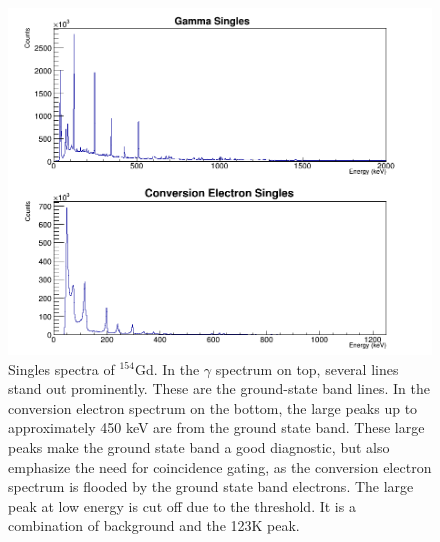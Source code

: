 \begin{figure}[!]
    \centering
    \includegraphics[scale=0.4]{154GdTablesAndFigs/154Gd_Singles.png}
    \caption{Singles spectra of $^{154}$Gd. In the $\gamma$ spectrum on top, several lines stand out prominently. These are the ground-state band lines. In the conversion electron spectrum on the bottom, the large peaks up to approximately 450 keV are from the ground state band. These large peaks make the ground state band a good diagnostic, but also emphasize the need for coincidence gating, as the conversion electron spectrum is flooded by the ground state band electrons. The large peak at low energy is cut off due to the threshold. It is a combination of background and the 123K peak.}
    \label{fig:154Gd_Singles}
\end{figure}